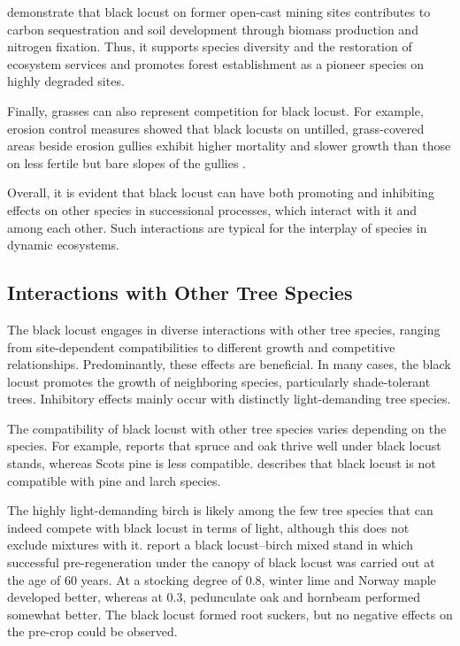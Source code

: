 \citet{evans2013robinie} demonstrate that black locust on former open-cast mining sites contributes to carbon sequestration and soil development through biomass production and nitrogen fixation. Thus, it supports species diversity and the restoration of ecosystem services and promotes forest establishment as a pioneer species on highly degraded sites.

Finally, grasses can also represent competition for black locust. For example, erosion control measures showed that black locusts on untilled, grass-covered areas beside erosion gullies exhibit higher mortality and slower growth than those on less fertile but bare slopes of the gullies \citep{meginnis1934robinie, cooper1950blacklocust}.

Overall, it is evident that black locust can have both promoting and inhibiting effects on other species in successional processes, which interact with it and among each other. Such interactions are typical for the interplay of species in dynamic ecosystems.


\subsection{Interactions with Other Tree Species}

The black locust engages in diverse interactions with other tree species, ranging from site-dependent compatibilities to different growth and competitive relationships. Predominantly, these effects are beneficial. In many cases, the black locust promotes the growth of neighboring species, particularly shade-tolerant trees. Inhibitory effects mainly occur with distinctly light-demanding tree species.

The compatibility of black locust with other tree species varies depending on the species. For example, \citet[p.~138]{krauss1986sauenerWald} reports that spruce and oak thrive well under black locust stands, whereas Scots pine is less compatible. \citet{kellog1934robinieMischbestand} describes that black locust is not compatible with pine and larch species.

The highly light-demanding birch is likely among the few tree species that can indeed compete with black locust in terms of light, although this does not exclude mixtures with it. \citet{gaier2009robinieVorverjuengung} report a black locust–birch mixed stand in which successful pre-regeneration under the canopy of black locust was carried out at the age of 60 years. At a stocking degree of 0.8, winter lime and Norway maple developed better, whereas at 0.3, pedunculate oak and hornbeam performed somewhat better. The black locust formed root suckers, but no negative effects on the pre-crop could be observed.

